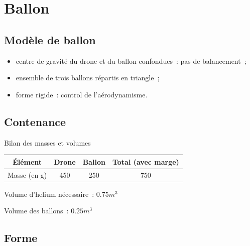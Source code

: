 \section{Ballon}

\subsection{Modèle de ballon}

\begin{frame}
	\begin{itemize}
		\item centre de gravité du drone et du ballon confondues~: pas de balancement~;
		\item ensemble de trois ballons répartis en triangle~;
		\item forme rigide~: control de l'aérodynamisme.
	\end{itemize}
\end{frame}

\subsection{Contenance}

\begin{frame}{Bilan des masses et volumes}
	\begin{center}
		\begin{tabular}{|c|c|c|c|}
			\hline
			Élément & Drone & Ballon & Total (avec marge) \\
			\hline
			Masse (en g) & 450 & 250 & 750 \\
			\hline
		\end{tabular}

	\end{center}

  Volume d'helium nécessaire~: $0.75 m^3$
  
  Volume des ballons~: $0.25 m^3$
\end{frame}

\subsection{Forme}

